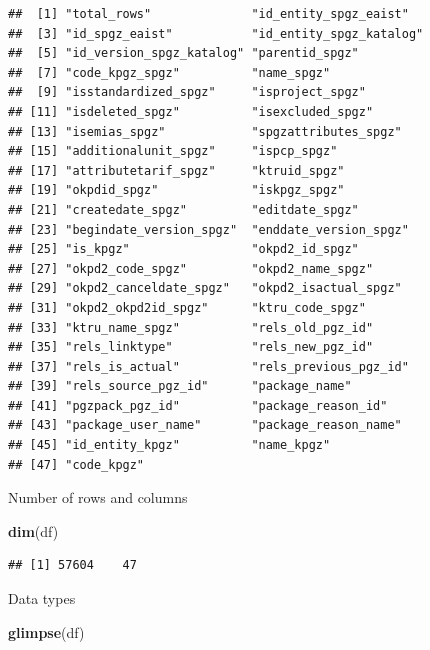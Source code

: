 \documentclass[
]{article}
\newenvironment{Shaded}{\begin{snugshade}}{\end{snugshade}}
\newcommand{\FunctionTok}[1]{\textcolor[rgb]{0.13,0.29,0.53}{\textbf{#1}}}
\newcommand{\NormalTok}[1]{#1}
\begin{document}
\begin{verbatim}
##  [1] "total_rows"              "id_entity_spgz_eaist"   
##  [3] "id_spgz_eaist"           "id_entity_spgz_katalog" 
##  [5] "id_version_spgz_katalog" "parentid_spgz"          
##  [7] "code_kpgz_spgz"          "name_spgz"              
##  [9] "isstandardized_spgz"     "isproject_spgz"         
## [11] "isdeleted_spgz"          "isexcluded_spgz"        
## [13] "isemias_spgz"            "spgzattributes_spgz"    
## [15] "additionalunit_spgz"     "ispcp_spgz"             
## [17] "attributetarif_spgz"     "ktruid_spgz"            
## [19] "okpdid_spgz"             "iskpgz_spgz"            
## [21] "createdate_spgz"         "editdate_spgz"          
## [23] "begindate_version_spgz"  "enddate_version_spgz"   
## [25] "is_kpgz"                 "okpd2_id_spgz"          
## [27] "okpd2_code_spgz"         "okpd2_name_spgz"        
## [29] "okpd2_canceldate_spgz"   "okpd2_isactual_spgz"    
## [31] "okpd2_okpd2id_spgz"      "ktru_code_spgz"         
## [33] "ktru_name_spgz"          "rels_old_pgz_id"        
## [35] "rels_linktype"           "rels_new_pgz_id"        
## [37] "rels_is_actual"          "rels_previous_pgz_id"   
## [39] "rels_source_pgz_id"      "package_name"           
## [41] "pgzpack_pgz_id"          "package_reason_id"      
## [43] "package_user_name"       "package_reason_name"    
## [45] "id_entity_kpgz"          "name_kpgz"              
## [47] "code_kpgz"
\end{verbatim}

Number of rows and columns

\begin{Shaded}
\begin{Highlighting}[]
\FunctionTok{dim}\NormalTok{(df)}
\end{Highlighting}
\end{Shaded}

\begin{verbatim}
## [1] 57604    47
\end{verbatim}

Data types

\begin{Shaded}
\begin{Highlighting}[]
\FunctionTok{glimpse}\NormalTok{(df)}
\end{Highlighting}
\end{Shaded}
\end{document}
